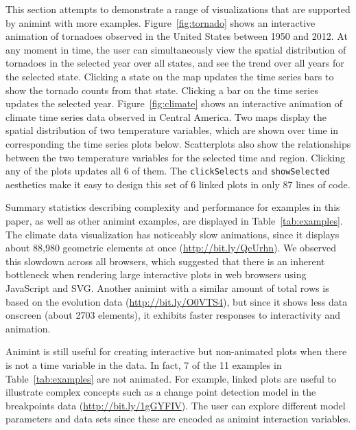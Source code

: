 \documentclass[12pt]{article}\usepackage[]{graphicx}\usepackage[]{color}
\begin{document}
This section attempts to demonstrate a range of visualizations that 
are supported by animint with more examples. 
Figure~\ref{fig:tornado} shows an interactive animation of tornadoes
observed in the United States between 1950 and 2012. At any moment in
time, the user can simultaneously view the spatial distribution of
tornadoes in the selected year over all states, and see the trend over
all years for the selected state. Clicking a state on the map updates the
time series bars to show the tornado counts from that state. Clicking
a bar on the time series updates the selected year. Figure~\ref{fig:climate} 
shows an interactive animation of climate
time series data observed in Central America. Two maps display the
spatial distribution of two temperature variables, which are shown
over time in corresponding the time series plots below. Scatterplots
also show the relationships between the two temperature variables for
the selected time and region. Clicking any of the plots updates all 6
of them. The \texttt{clickSelects} and \texttt{showSelected} aesthetics make it
easy to design this set of 6 linked plots in only 87 lines of code.

Summary statistics describing complexity and performance for 
examples in this paper, as well as other animint examples, 
are displayed in Table~\ref{tab:examples}. The climate data 
visualization has noticeably slow animations, 
since it displays about 88,980 geometric elements at once 
(\url{http://bit.ly/QcUrhn}). We observed
this slowdown across all browsers, which suggested that there is an
inherent bottleneck when rendering large interactive plots in web
browsers using JavaScript and SVG. Another animint with a similar
amount of total rows is based on the evolution data
(\url{http://bit.ly/O0VTS4}), but since it shows less data onscreen
(about 2703 elements), it exhibits faster responses to interactivity
and animation.

Animint is still useful for creating interactive but
non-animated plots when there is not a time variable in the data.
In fact, 7 of the 11 examples in
Table~\ref{tab:examples} are not animated. For example, linked plots
are useful to illustrate complex concepts such as a change point
detection model in the breakpoints data
(\url{http://bit.ly/1gGYFIV}). The user can explore different model
parameters and data sets since these are encoded as animint
interaction variables.
\end{document}
